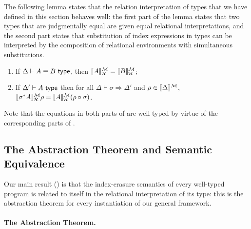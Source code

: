 The following lemma states that the relation interpretation of types
that we have defined in this section behaves well: the first part of
the lemma states that two types that are judgmentally equal are given
equal relational interpretations, and the second part states that
substitution of index expressions in types can be interpreted by the
composition of relational environments with simultaneous
substitutions.
\begin{lemma}\label{lem:tyeqsubst-relational}
\par
  \begin{enumerate}
  \item If $\Delta \vdash A \equiv B \textup{\textsf{ type}}$, then $\llbracket A \rrbracket^{\mathcal{M}}_{\mathcal{R}} =  \llbracket B \rrbracket^{\mathcal{M}}_{\mathcal{R}}$;
  \item If $\Delta' \vdash A \textup{\textsf{ type}}$ then for all $\Delta \vdash \sigma \Rightarrow
    \Delta'$ and $\rho \in \llbracket \Delta \rrbracket^{\mathcal{M}}$,
    $\llbracket \sigma^*A \rrbracket^{\mathcal{M}}_{\mathcal{R}} \rho = \llbracket A \rrbracket^{\mathcal{M}}_{\mathcal{R}}(\rho \circ \sigma)$.
  \end{enumerate}
\end{lemma}
\noindent
Note that the equations in both parts of
 are well-typed by virtue of the
corresponding parts of .



\subsection{The Abstraction Theorem and Semantic Equivalence}
\label{sec:abstraction-theorem}

Our main result
() is that the index-erasure semantics of
every well-typed program is related to itself in the relational
interpretation of its type: this is the abstraction theorem for every
instantiation of our general framework.

\paragraph{The Abstraction Theorem.}

